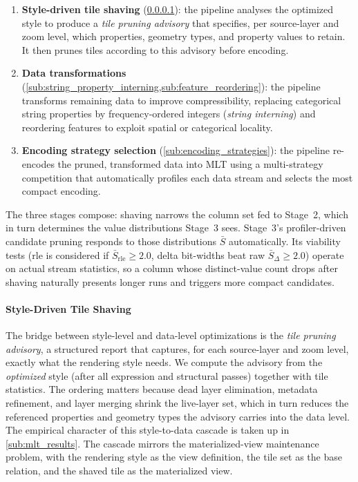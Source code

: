 {\begin{enumerate}
    \item \textbf{Style-driven tile shaving} (\cref{sub:tile_shaving}): the pipeline analyses the optimized style to produce a \emph{tile pruning advisory} that specifies, per source-layer and zoom level, which properties, geometry types, and property values to retain.
    It then prunes tiles according to this advisory before encoding.
    \item \textbf{Data transformations} (\cref{sub:string_property_interning,sub:feature_reordering}): the pipeline transforms remaining data to improve compressibility, replacing categorical string properties by frequency-ordered integers (\emph{string interning}) and reordering features to exploit spatial or categorical locality.
    \item \textbf{Encoding strategy selection} (\cref{sub:encoding_strategies}): the pipeline re-encodes the pruned, transformed data into \ac{MLT} using a multi-strategy competition that automatically profiles each data stream and selects the most compact encoding.
\end{enumerate}

\noindent The three stages compose:
shaving narrows the column set fed to Stage~2, which in turn determines the value distributions Stage~3 sees.
Stage~3's profiler-driven candidate pruning responds to those distributions $\bar{S}$ automatically.
Its viability tests (rle is considered if $\bar{S}_\text{rle} \geq 2.0$, delta bit-widths beat raw $\bar{S}_\Delta \geq 2.0$) operate on actual stream statistics, so a column whose distinct-value count drops after shaving naturally presents longer runs and triggers more compact candidates.

\paragraph{Style-Driven Tile Shaving}\label{sub:tile_shaving}

The bridge between style-level and data-level optimizations is the \emph{tile pruning advisory}, a structured report that captures, for each source-layer and zoom level, exactly what the rendering style needs.
We compute the advisory from the \emph{optimized} style (after all expression and structural passes) together with tile statistics.
The ordering matters because dead layer elimination, metadata refinement, and layer merging shrink the live-layer set, which in turn reduces the referenced properties and geometry types the advisory carries into the data level.
The empirical character of this style-to-data cascade is taken up in \cref{sub:mlt_results}.
The cascade mirrors the materialized-view maintenance problem, with the rendering style as the view definition, the tile set as the base relation, and the shaved tile as the materialized view.

}
